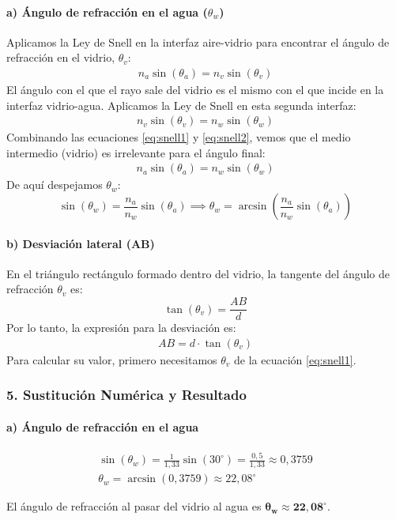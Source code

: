 \paragraph*{a) Ángulo de refracción en el agua ($\theta_w$)}
Aplicamos la Ley de Snell en la interfaz aire-vidrio para encontrar el ángulo de refracción en el vidrio, $\theta_v$:
\begin{gather}
    n_a \sin(\theta_a) = n_v \sin(\theta_v) \label{eq:snell1}
\end{gather}
El ángulo con el que el rayo sale del vidrio es el mismo con el que incide en la interfaz vidrio-agua. Aplicamos la Ley de Snell en esta segunda interfaz:
\begin{gather}
    n_v \sin(\theta_v) = n_w \sin(\theta_w) \label{eq:snell2}
\end{gather}
Combinando las ecuaciones \eqref{eq:snell1} y \eqref{eq:snell2}, vemos que el medio intermedio (vidrio) es irrelevante para el ángulo final:
\begin{gather}
    n_a \sin(\theta_a) = n_w \sin(\theta_w)
\end{gather}
De aquí despejamos $\theta_w$:
$$ \sin(\theta_w) = \frac{n_a}{n_w} \sin(\theta_a) \implies \theta_w = \arcsin\left(\frac{n_a}{n_w} \sin(\theta_a)\right) $$

\paragraph*{b) Desviación lateral (AB)}
En el triángulo rectángulo formado dentro del vidrio, la tangente del ángulo de refracción $\theta_v$ es:
$$ \tan(\theta_v) = \frac{AB}{d} $$
Por lo tanto, la expresión para la desviación es:
\begin{gather}
    AB = d \cdot \tan(\theta_v)
\end{gather}
Para calcular su valor, primero necesitamos $\theta_v$ de la ecuación \eqref{eq:snell1}.

\subsubsection*{5. Sustitución Numérica y Resultado}
\paragraph*{a) Ángulo de refracción en el agua}
\begin{gather}
    \sin(\theta_w) = \frac{1}{1,33} \sin(30^\circ) = \frac{0,5}{1,33} \approx 0,3759 \\
    \theta_w = \arcsin(0,3759) \approx 22,08^\circ
\end{gather}
\begin{cajaresultado}
    El ángulo de refracción al pasar del vidrio al agua es $\boldsymbol{\theta_w \approx 22,08^\circ}$.
\end{cajaresultado}

